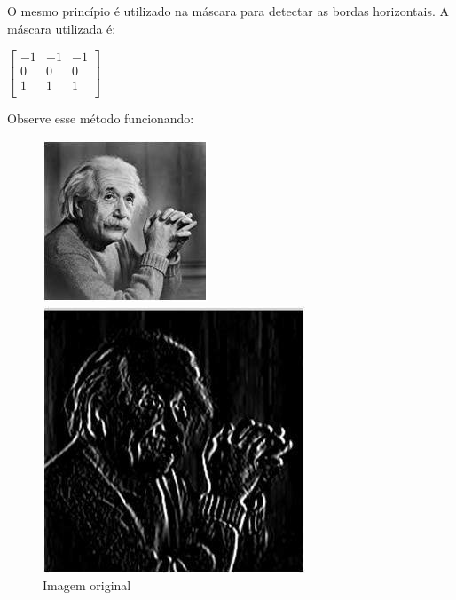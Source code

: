 \documentclass[a4paper, 12pt]{article}
\begin{document}
O mesmo princípio é utilizado na máscara para detectar as bordas horizontais. A máscara utilizada é:
\begin{center}
	$
	\begin{bmatrix}
	   -1 & -1  & -1 \\
		0 &  0  &  0 \\
		1 &  1  &  1 \\
	\end{bmatrix}
	$
\end{center}
Observe esse método funcionando:
\begin{figure}[!htb]
	\centering
	  	\includegraphics[width=\linewidth]{images/einstein256.jpg}
	  	\caption{Imagem original}
	\endminipage\hspace{1cm}
		\includegraphics[width=\linewidth]{images/prewittvert.jpg}

\end{figure}
\end{document}
